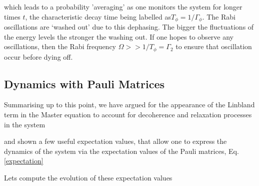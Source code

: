   \noindent which leads to a probability 'averaging' as one monitors the system for longer times $ t $, the characteristic decay time being labelled as$ T_\phi =1/\Gamma_\phi $. The Rabi oscillations are `washed out' due to this dephasing. The bigger the fluctuations of the energy levels the stronger the washing out. If one hopes to observe any oscillations, then the Rabi frequency $ \Omega>>1/T_\phi = \Gamma_2 $ to ensure that oscillation occur before dying off.
  
  \begin{figure}
  \end{figure}
 
 \newpage
 
 \subsection{Dynamics with Pauli Matrices\label{subsec:dynamics_with_pauli}}
  Summarising up to this point, we have argued for the appearance of the Linbland term in the Master equation to account for decoherence and relaxation processes in the system 
  
  \noindent and shown a few useful expectation values, that allow one to express the dynamics of the system via the expectation values of the Pauli matrices, Eq.\eqref{expectation}
  
  
  \noindent Lets compute the evolution of these expectation values
  
